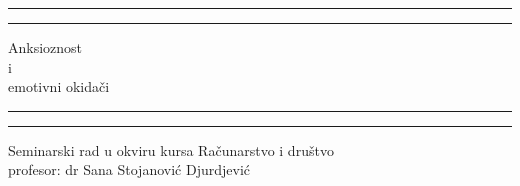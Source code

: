 \documentclass[a4paper]{article}
\begin{document}
    \begin{titlepage} %

	\centering %
	
	\scshape %
	
	\vspace*{\baselineskip} %
	
	
	\rule{\textwidth}{1.6pt}\vspace*{-\baselineskip}\vspace*{2pt} %
	\rule{\textwidth}{0.4pt} %
	
	\vspace{0.75\baselineskip} %
	
	{\LARGE Anksioznost\\ i\\ emotivni okidači\\} %
	
	\vspace{0.75\baselineskip} %
	
	\rule{\textwidth}{0.4pt}\vspace*{-\baselineskip}\vspace{3.2pt} %
	\rule{\textwidth}{1.6pt} %
	
	\vspace{2\baselineskip} %
	
	
	Seminarski rad u okviru kursa Računarstvo i društvo \\ profesor: dr Sana Stojanović Djurdjević %
	
	\vspace*{3\baselineskip} %
	
	
	
	
	\vspace{0.5\baselineskip} %
	

\end{titlepage}
\end{document}
